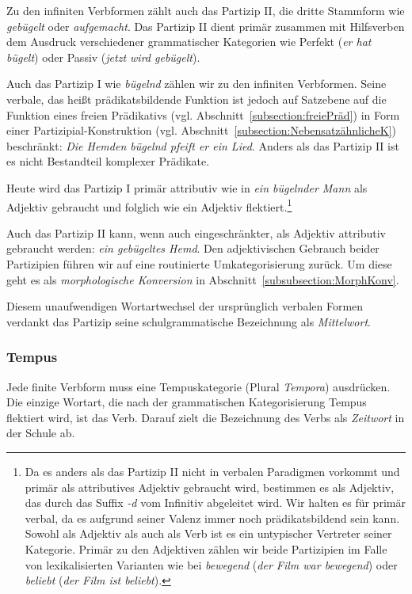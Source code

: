 Zu den infiniten Verbformen zählt auch das Partizip II, die dritte Stammform wie \textit{gebügelt} oder \textit{aufgemacht}. Das Partizip II dient primär zusammen mit Hilfsverben dem Ausdruck verschiedener grammatischer Kategorien wie Perfekt (\textit{er hat bügelt}) oder Passiv (\textit{jetzt wird gebügelt}).   

Auch das Partizip I wie \textit{bügelnd} zählen wir zu den infiniten Verbformen. Seine verbale, das heißt prädikatsbildende Funktion ist jedoch auf Satzebene auf die Funktion eines freien Prädikativs (vgl. Abschnitt~\ref{subsection:freiePräd}) in Form einer  Partizipial-Konstruktion (vgl. Abschnitt~\ref{subsection:NebensatzähnlicheK}) beschränkt: \textit{Die Hemden bügelnd pfeift er ein Lied}. Anders als das Partizip II ist es nicht Bestandteil komplexer Prädikate.

Heute wird das Partizip I primär attributiv wie in \textit{ein bügelnder Mann} als Adjektiv gebraucht und folglich wie ein Adjektiv flektiert.\footnote{Da es anders als das Partizip II nicht in verbalen Paradigmen vorkommt und primär als attributives Adjektiv gebraucht wird, bestimmen es \citet[49]{ZifHoffStr1997} als Adjektiv, das durch das Suffix \textit{-d} vom Infinitiv abgeleitet wird. Wir halten es für primär verbal, da es aufgrund seiner Valenz immer noch prädikatsbildend sein kann. Sowohl als Adjektiv als auch als Verb ist es ein untypischer Vertreter seiner Kategorie. Primär zu den Adjektiven zählen wir beide Partizipien im Falle von lexikalisierten Varianten wie bei \textit{bewegend} (\textit{der Film war bewegend}) oder \textit{beliebt} (\textit{der Film ist beliebt}).}

Auch das Partizip II kann, wenn auch eingeschränkter, als Adjektiv attributiv gebraucht werden: \textit{ein gebügeltes Hemd}. Den adjektivischen Gebrauch beider Partizipien führen wir auf eine routinierte Umkategorisierung zurück. Um diese geht es als \textit{morphologische Konversion} in Abschnitt~\ref{subsubsection:MorphKonv}.

Diesem unaufwendigen Wortartwechsel der ursprünglich verbalen Formen verdankt das Partizip seine schulgrammatische Bezeichnung als \textit{Mittelwort}.


\subsubsection{Tempus}\label{subsubsection:Tempus}

Jede finite Verbform muss eine Tempuskategorie (Plural \textit{Tempora}) ausdrücken. Die einzige Wortart, die nach der grammatischen Kategorisierung Tempus flektiert wird, ist das Verb. Darauf zielt die Bezeichnung des Verbs als \textit{Zeitwort} in der Schule ab. 

